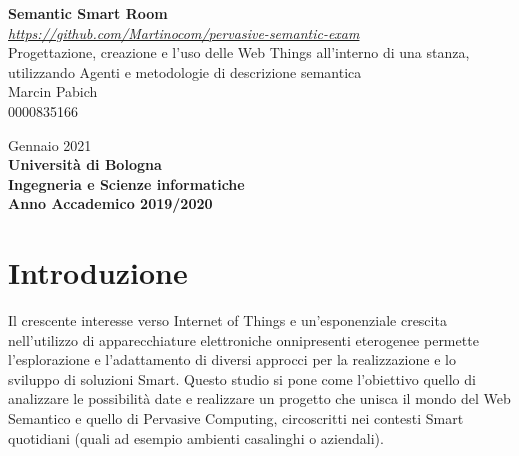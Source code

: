 \documentclass[12pt,a4paper,openright,oneside]{report}
\begin{document}
\begin{titlepage}
	\begin{center}
		
		\vspace*{40mm}
		{\Large{\textbf{Semantic Smart Room}}}\\
		
		\vspace*{4mm}
		{\small{\textit{\url{https://github.com/Martinocom/pervasive-semantic-exam}}}}\\
		
		\vspace*{4mm}
		{\Large{Progettazione, creazione e l'uso delle Web Things all'interno di una stanza, utilizzando Agenti e metodologie di descrizione semantica}}\\
		
		\vspace{10mm}
		{\Large{Marcin Pabich\\}}
		{\large{0000835166}}
		
		\vspace{10mm}
		{\large{Gennaio 2021}}\\
		
		\vspace{20mm}
		{\large{\bf Università di Bologna}}\\
		\vspace{1mm}
		{\large{\bf Ingegneria e Scienze informatiche}}\\
		\vspace{1mm}
		{\large{\bf Anno Accademico 2019/2020}}
		\vspace*{\fill}
	\end{center}
\end{titlepage}
\tableofcontents                        %
\clearpage{\pagestyle{empty}\cleardoublepage}
\listoffigures                          %
\clearpage{\pagestyle{empty}\cleardoublepage}
\lstlistoflistings						%

\clearpage{\pagestyle{empty}\cleardoublepage}
\chapter{Introduzione}
Il crescente interesse verso Internet of Things e un'esponenziale crescita nell'utilizzo di apparecchiature elettroniche onnipresenti eterogenee permette l'esplorazione e l'adattamento di diversi approcci per la realizzazione e lo sviluppo di soluzioni Smart. Questo studio si pone come l'obiettivo quello di analizzare le possibilità date e realizzare un progetto che unisca il mondo del Web Semantico e quello di Pervasive Computing, circoscritti nei contesti Smart quotidiani (quali ad esempio ambienti casalinghi o aziendali).\\
\end{document}
